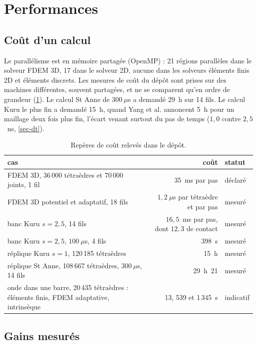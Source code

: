 \section{Performances}
\label{sec-performances}

\subsection{Coût d'un calcul}

Le parallélisme est en mémoire partagée (OpenMP) : 21 régions parallèles dans le solveur FDEM 3D, 17 dans le solveur 2D, aucune dans les solveurs éléments finis 2D et éléments discrets. Les mesures de coût du dépôt sont prises sur des machines différentes, souvent partagées, et ne se comparent qu'en ordre de grandeur (\cref{tab-couts}). Le calcul St Anne de $300~\mu$s a demandé 29~h sur 14 fils. Le calcul Kuru le plus fin a demandé 15~h, quand Yang et al. annoncent 5~h pour un maillage deux fois plus fin, l'écart venant surtout du pas de temps ($1{,}0$ contre $2{,}5$~ns, \cref{sec-dt}).

\begin{table}[htbp]
\centering
\caption{Repères de coût relevés dans le dépôt.}
\label{tab-couts}
\begin{tabularx}{\linewidth}{@{}X r l@{}}
\toprule
cas & coût & statut \\
\midrule
FDEM 3D, 36\,000 tétraèdres et 70\,000 joints, 1 fil & 35~ms par pas & déclaré \\
FDEM 3D potentiel et adaptatif, 18 fils & $1{,}2~\mu$s par tétraèdre et par pas & mesuré \\
banc Kuru $s = 2{,}5$, 14 fils & $16{,}5$~ms par pas, dont $12{,}3$ de contact & mesuré \\
banc Kuru $s = 2{,}5$, $100~\mu$s, 4 fils & 398~s & mesuré \\
réplique Kuru $s = 1$, 120\,185 tétraèdres & 15~h & mesuré \\
réplique St Anne, 108\,667 tétraèdres, $300~\mu$s, 14 fils & 29~h~21 & mesuré \\
onde dans une barre, 20\,435 tétraèdres : éléments finis, FDEM adaptative, intrinsèque & 13, 539 et 1\,345~s & indicatif \\
\bottomrule
\end{tabularx}
\end{table}

\subsection{Gains mesurés}

